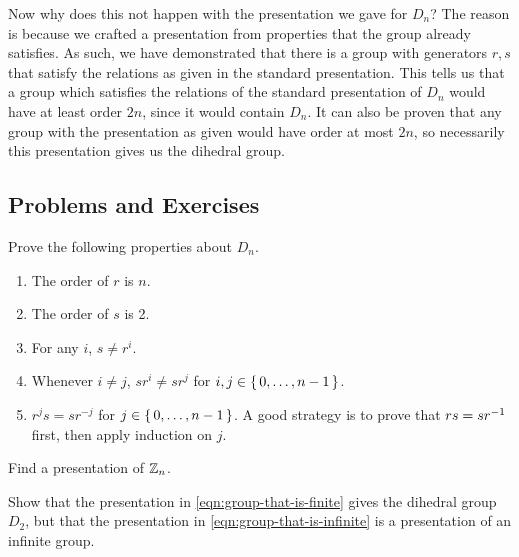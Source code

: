 \documentclass[./main.tex]{subfiles}
\begin{document}
Now why does this not happen with the presentation we gave for $D_n$? The reason
is because we crafted a presentation from properties that the group already
satisfies. As such, we have demonstrated that there is a group with generators
$r, s$ that satisfy the relations as given in the standard presentation. This
tells us that a group which satisfies the relations of the standard presentation
of $D_n$ would have at least order $2n$, since it would contain $D_n$. It can
also be proven that any group with the presentation as given would have order at
most $2n$, so necessarily this presentation gives us the dihedral group. 

\subsection{Problems and Exercises}

\begin{exercise}[Properties of $D_n$]
\label{ex:basic-properties-of-dihedral-group}
    Prove the following properties about $D_n$. 
    \begin{enumerate}
        \item The order of $r$ is $n$.
        \item The order of $s$ is 2.
        \item For any $i$, $s \neq r^i$. 
        \item Whenever $i \neq j$, $sr^i \neq sr^j$ for $i, j \in \set{0, \dots, n-1}$.
        \item $r^j s = sr^{-j}$ for $j \in \set{0, \dots, n-1}$. A good strategy is to prove that $rs = sr^{-1}$
        first, then apply induction on $j$.
    \end{enumerate}
\end{exercise}

\begin{exercise}
    Find a presentation of $\mathbb{Z}_n$. 
\end{exercise}

\begin{exercise}
\label{ex:similar-presentations-but-finite-infinite}
    Show that the presentation in \cref{eqn:group-that-is-finite} gives the
    dihedral group $D_2$, but that the presentation in
    \cref{eqn:group-that-is-infinite} is a presentation of an infinite group.
\end{exercise}
\end{document}
